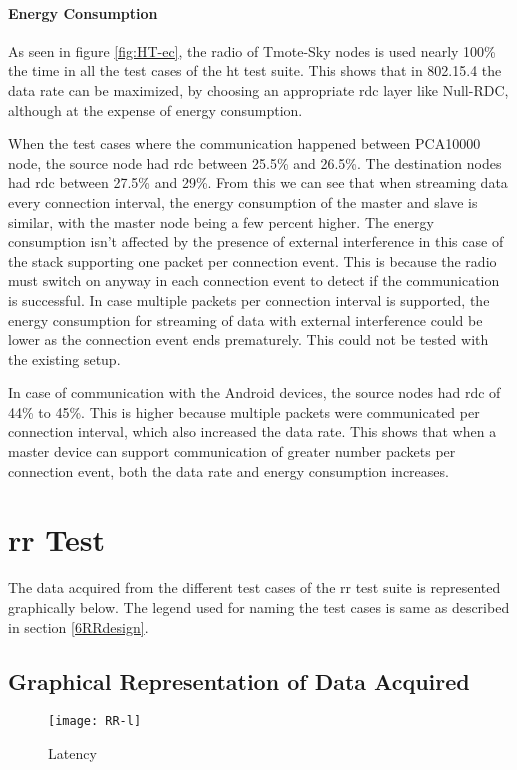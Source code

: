 \paragraph{Energy Consumption}
As seen in figure \ref{fig:HT-ec}, the radio of Tmote-Sky nodes is used nearly 100\% the time in all the test cases of the \gls{ht} test suite. This shows that in 802.15.4 the data rate can be maximized, by choosing an appropriate \gls{rdc} layer like Null-RDC, although at the expense of energy consumption. 

When the test cases where the communication happened between PCA10000 node, the source node had \gls{rdc} between 25.5\% and 26.5\%. The destination nodes had \gls{rdc} between 27.5\% and 29\%. From this we can see that when streaming data every connection interval, the energy consumption of the master and slave is similar, with the master node being a few percent higher. The energy consumption isn't affected by the presence of external interference in this case of the stack supporting one packet per connection event. This is because the radio must switch on anyway in each connection event to detect if the communication is successful. In case multiple packets per connection interval is supported, the energy consumption for streaming of data with external interference could be lower as the connection event ends prematurely. This could not be tested with the existing setup.

In case of communication with the Android devices, the source nodes had \gls{rdc} of 44\% to 45\%. This is higher because multiple packets were communicated per connection interval, which also increased the data rate. This shows that when a master device can support communication of greater number packets per connection event, both the data rate and energy consumption increases.

\section{\acrlong{rr} Test}
The data acquired from the different test cases of the \gls{rr} test suite is represented graphically below. The legend used for naming the test cases is same as described in section \ref{6RRdesign}.
\subsection{Graphical Representation of Data Acquired}
\begin{figure}[h]
\texttt{[image: RR-l]}
\caption{Latency}
\label{fig:RR-l}
\end{figure}

